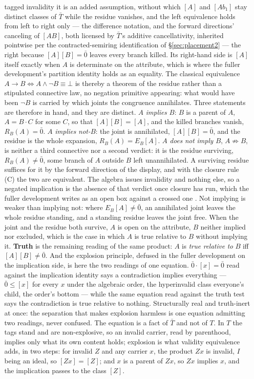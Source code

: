 tagged invalidity it is an added assumption, without which $[A]$ and $[A b_1]$ stay distinct classes of $\bar{T}$ while the residue vanishes, and the left equivalence holds from left to right only --- the difference notation, and the forward directions' canceling of $[AB]$, both licensed by $\bar{T}$'s additive cancellativity, inherited pointwise per the contracted-semiring identification of \S\ref{sec:placement2} --- the right because $[A][B] = \bar{0}$ leaves every branch killed. Its right-hand side is $[A]$ itself exactly when $A$ is determinate on the attribute, which is where the fuller development's partition identity holds as an equality. The classical equivalence $A \to B \iff A \wedge \lnot B \equiv \bot$ is thereby a theorem of the residue rather than a stipulated connective law, no negation primitive appearing: what would have been $\lnot B$ is carried by which joints the congruence annihilates. Three statements are therefore in hand, and they are distinct. \emph{$A$ implies $B$}: $B$ is a parent of $A$, $A = B \cdot C$ for some $C$, so that $[A][B] = [A]$, and the killed branches vanish, $R_B(A) = \bar{0}$. \emph{$A$ implies not-$B$}: the joint is annihilated, $[A][B] = \bar{0}$, and the residue is the whole expansion, $R_B(A) = E_B[A]$. \emph{$A$ does not imply $B$}, $A \not\Rightarrow B$, is neither a third connective nor a second verdict: it is the residue surviving, $R_B(A) \neq \bar{0}$, some branch of $A$ outside $B$ left unannihilated. A surviving residue suffices for it by the forward direction of the display, and with the closure rule (C) the two are equivalent. The algebra issues invalidity and nothing else, so a negated implication is the absence of that verdict once closure has run, which the fuller development writes as an open box against a crossed one \cite{Aethus}. Not implying is weaker than implying not: where $E_B[A] \neq \bar{0}$, an annihilated joint leaves the whole residue standing, and a standing residue leaves the joint free. When the joint and the residue both survive, $A$ is open on the attribute, $B$ neither implied nor excluded, which is the case in which $A$ is true relative to $B$ without implying it. \textbf{Truth} is the remaining reading of the same product: $A$ is \emph{true relative to} $B$ iff $[A][B] \neq \bar{0}$. And the explosion principle, defused in the fuller development on the implication side, is here the two readings of one equation. $\bar{0}\cdot[x] = \bar{0}$ read against the implication identity says a contradiction implies everything --- $\bar{0} \leq [x]$ for every $x$ under the algebraic order, the hyperinvalid class everyone's child, the order's bottom --- while the same equation read against the truth test says the contradiction is true relative to nothing. Structurally real and truth-inert at once: the separation that makes explosion harmless is one equation admitting two readings, never confused. The equation is a fact of $\bar{T}$ and not of $T$. In $T$ the tags stand and are non-explosive, so an invalid carrier, read by parenthood, implies only what its own content holds; explosion is what validity equivalence adds, in two steps: for invalid $Z$ and any carrier $x$, the product $Zx$ is invalid, $I$ being an ideal, so $[Zx] = [Z]$; and $x$ is a parent of $Zx$, so $Zx$ implies $x$, and the implication passes to the class $[Z]$.
